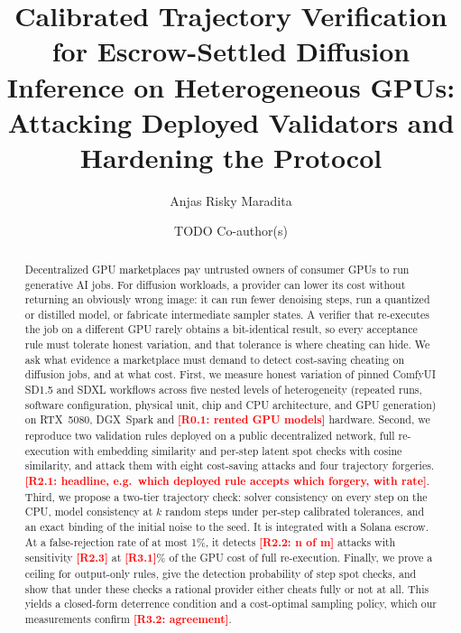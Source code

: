 \documentclass[preprint,review,12pt,authoryear]{elsarticle}
\newcommand{\res}[1]{\textcolor{red}{\textbf{[#1]}}}          %
\theoremstyle{definition}
\begin{document}
\begin{frontmatter}

\title{Calibrated Trajectory Verification for Escrow-Settled Diffusion Inference on Heterogeneous GPUs: Attacking Deployed Validators and Hardening the Protocol}

\author[uph]{Anjas Risky Maradita}
\author[uph]{TODO Co-author(s)}%

\begin{abstract}
Decentralized GPU marketplaces pay untrusted owners of consumer GPUs to run generative AI jobs. For diffusion workloads, a provider can lower its cost without returning an obviously wrong image: it can run fewer denoising steps, run a quantized or distilled model, or fabricate intermediate sampler states. A verifier that re-executes the job on a different GPU rarely obtains a bit-identical result, so every acceptance rule must tolerate honest variation, and that tolerance is where cheating can hide. We ask what evidence a marketplace must demand to detect cost-saving cheating on diffusion jobs, and at what cost. First, we measure honest variation of pinned ComfyUI SD1.5 and SDXL workflows across five nested levels of heterogeneity (repeated runs, software configuration, physical unit, chip and CPU architecture, and GPU generation) on RTX~5080, DGX~Spark and \res{R0.1: rented GPU models} hardware. Second, we reproduce two validation rules deployed on a public decentralized network, full re-execution with embedding similarity and per-step latent spot checks with cosine similarity, and attack them with eight cost-saving attacks and four trajectory forgeries. \res{R2.1: headline, e.g.\ which deployed rule accepts which forgery, with rate}. Third, we propose a two-tier trajectory check: solver consistency on every step on the CPU, model consistency at $k$ random steps under per-step calibrated tolerances, and an exact binding of the initial noise to the seed. It is integrated with a Solana escrow. At a false-rejection rate of at most 1\%, it detects \res{R2.2: n of m} attacks with sensitivity \res{R2.3} at \res{R3.1}\% of the GPU cost of full re-execution. Finally, we prove a ceiling for output-only rules, give the detection probability of step spot checks, and show that under these checks a rational provider either cheats fully or not at all. This yields a closed-form deterrence condition and a cost-optimal sampling policy, which our measurements confirm \res{R3.2: agreement}.
\end{abstract}


\end{frontmatter}
\end{document}
